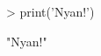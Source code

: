 \documentclass{article}
\begin{document}


\begin{Schunk}
\begin{Sinput}
> print('Nyan!')
\end{Sinput}
\begin{Soutput}
[1] "Nyan!"
\end{Soutput}
\end{Schunk}
\end{document}
